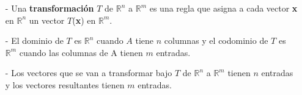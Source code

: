 \documentclass[12 pt]{article}
\begin{document}
\begin{tcolorbox}[colback=red!10!white, colframe=red!70!black, title=Resumen]
    \begin{itemize}
        \item[-] Una \textbf{transformación} $T$ de $\mathbb{R}^n$ a $\mathbb{R}^m$ es una regla que asigna a cada vector \textbf{x} en $\mathbb{R}^n$ un vector $T$(\textbf{x}) en $\mathbb{R}^m$.
        \item[-] El dominio de $T$ es $\mathbb{R}^n$ cuando $A$ tiene $n$ columnas y el codominio de $T$ es $\mathbb{R}^m$ cuando las columnas de A tienen $m$ entradas.
        \item[-] Los vectores que se van a transformar bajo $T$ de $\mathbb{R}^n$ a $\mathbb{R}^m$ tienen $n$ entradas y los vectores resultantes tienen $m$ entradas.
    \end{itemize}
\end{tcolorbox}


\end{document}
